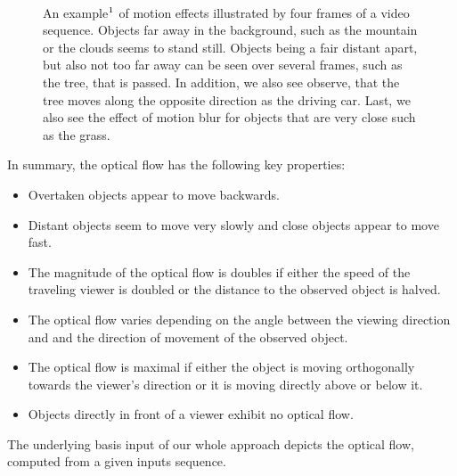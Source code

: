 \begin{figure}[H]
\begin{center}
~
\end{center}
\caption[Motion Example]{An example$\footnotemark$ of motion effects illustrated by four frames of a video sequence. Objects far away in the background, such as the mountain or the clouds seems to stand still. Objects being a fair distant apart, but also not too far away can be seen over several frames, such as the tree, that is passed. In addition, we also see observe, that the tree moves along the opposite direction as the driving car. Last, we also see the effect of motion blur for objects that are very close such as the grass.}
\label{fig:motion_eg}
\end{figure}

In summary, the optical flow has the following key properties:
\begin{itemize}
  \item Overtaken objects appear to move backwards.
  \item Distant objects seem to move very slowly and close objects appear to move fast.
  \item The magnitude of the optical flow is doubles if either the speed of the traveling viewer is doubled or the distance to the observed object is halved.
  \item The optical flow varies depending on the angle between the viewing direction and and the direction of movement of the observed object.
  \item The optical flow is maximal if either the object is moving orthogonally towards the viewer's direction or it is moving directly above or below it.
  \item Objects directly in front of a viewer exhibit no optical flow.
\end{itemize}

The underlying basis input of our whole approach depicts the optical flow, computed from a given inputs sequence.

